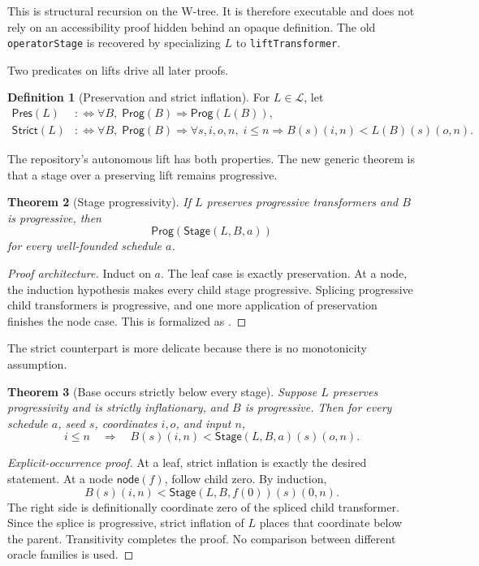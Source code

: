 \documentclass[11pt]{article}
\newtheorem{theorem}{Theorem}[section]
\theoremstyle{definition}
\newtheorem{definition}[theorem]{Definition}
\newcommand{\Lift}{\mathcal{L}}
\newcommand{\Prog}{\mathsf{Prog}}
\newcommand{\Strict}{\mathsf{Strict}}
\newcommand{\stage}{\mathsf{Stage}}
\newcommand{\code}[1]{\texttt{#1}}
\begin{document}
This is structural recursion on the W-tree.  It is therefore executable and does not rely on an accessibility proof hidden behind an opaque definition.  The old \code{operatorStage} is recovered by specializing $L$ to \code{liftTransformer}.

Two predicates on lifts drive all later proofs.

\begin{definition}[Preservation and strict inflation]
For $L\in\Lift$, let
\begin{align*}
 \mathsf{Pres}(L)
  &:\Longleftrightarrow \forall B,\;\Prog(B)\Rightarrow\Prog(L(B)),\\
 \Strict(L)
  &:\Longleftrightarrow \forall B,\;\Prog(B)\Rightarrow
     \forall s,i,o,n,\;i\le n\Rightarrow B(s)(i,n)<L(B)(s)(o,n).
\end{align*}
\end{definition}

The repository's autonomous lift has both properties.  The new generic theorem is that a stage over a preserving lift remains progressive.

\begin{theorem}[Stage progressivity]
If $L$ preserves progressive transformers and $B$ is progressive, then
\[
  \Prog(\stage(L,B,a))
\]
for every well-founded schedule $a$.
\end{theorem}

\begin{proof}[Proof architecture]
Induct on $a$.  The leaf case is exactly preservation.  At a node, the induction hypothesis makes every child stage progressive.  Splicing progressive child transformers is progressive, and one more application of preservation finishes the node case.  This is formalized as .
\end{proof}

The strict counterpart is more delicate because there is no monotonicity assumption.

\begin{theorem}[Base occurs strictly below every stage]
Suppose $L$ preserves progressivity and is strictly inflationary, and $B$ is progressive.  Then for every schedule $a$, seed $s$, coordinates $i,o$, and input $n$,
\[
  i\le n\quad\Longrightarrow\quad
  B(s)(i,n)<\stage(L,B,a)(s)(o,n).
\]
\end{theorem}

\begin{proof}[Explicit-occurrence proof]
At a leaf, strict inflation is exactly the desired statement.  At a node $\mathsf{node}(f)$, follow child zero.  By induction,
\[
 B(s)(i,n)<\stage(L,B,f(0))(s)(0,n).
\]
The right side is definitionally coordinate zero of the spliced child transformer.  Since the splice is progressive, strict inflation of $L$ places that coordinate below the parent.  Transitivity completes the proof.  No comparison between different oracle families is used.
\end{proof}
\end{document}
